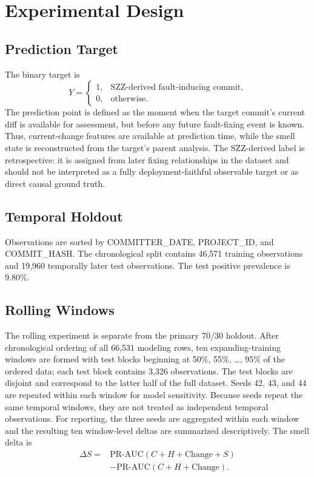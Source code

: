 \documentclass[conference]{IEEEtran}
\begin{document}
\section{Experimental Design}
\subsection{Prediction Target}
The binary target is
\begin{equation}
Y=\begin{cases}1,&\text{SZZ-derived fault-inducing commit},\\0,&\text{otherwise.}\end{cases}
\end{equation}
The prediction point is defined as the moment when the target commit's current diff is available for assessment, but before any future fault-fixing event is known. Thus, current-change features are available at prediction time, while the smell state is reconstructed from the target's parent analysis. The SZZ-derived label is retrospective: it is assigned from later fixing relationships in the dataset and should not be interpreted as a fully deployment-faithful observable target or as direct causal ground truth.

\subsection{Temporal Holdout}
Observations are sorted by COMMITTER\_DATE, PROJECT\_ID, and COMMIT\_HASH. The chronological split contains 46,571 training observations and 19,960 temporally later test observations. The test positive prevalence is 9.80\%.

\subsection{Rolling Windows}
The rolling experiment is separate from the primary 70/30 holdout. After chronological ordering of all 66,531 modeling rows, ten expanding-training windows are formed with test blocks beginning at 50\%, 55\%, \ldots, 95\% of the ordered data; each test block contains 3,326 observations. The test blocks are disjoint and correspond to the latter half of the full dataset. Seeds 42, 43, and 44 are repeated within each window for model sensitivity. Because seeds repeat the same temporal windows, they are not treated as independent temporal observations. For reporting, the three seeds are aggregated within each window and the resulting ten window-level deltas are summarized descriptively. The smell delta is
\begin{equation}
\begin{aligned}
\Delta S={}&\mathrm{PR\!\mbox{-}\!AUC}(C+H+\mathrm{Change}+S)\\
&-\mathrm{PR\!\mbox{-}\!AUC}(C+H+\mathrm{Change}).
\end{aligned}
\end{equation}
\end{document}
